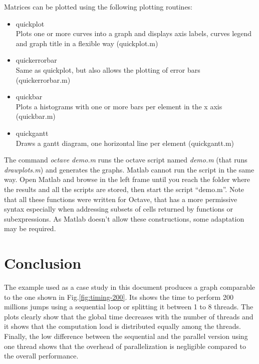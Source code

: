 Matrices can be plotted using the following plotting routines:
\begin{itemize}
\item quickplot\\
Plots one or more curves into a graph and displays axis labels, curves legend and graph title in a flexible way (quickplot.m)
\item quickerrorbar\\
Same as quickplot, but also allows the plotting of error bars (quickerrorbar.m)
\item quickbar\\
Plots a histograms with one or more bars per element in the x axis (quickbar.m)
\item quickgantt\\
Draws a gantt diagram, one horizontal line per element (quickgantt.m)
\end{itemize}

The command \emph{octave demo.m} runs the octave script named \emph{demo.m} (that runs \emph{drawplots.m}) and generates the graphs. Matlab cannot run the script in the same way. Open Matlab and browse in the left frame until you reach the folder where the results and all the scripts are stored, then start the script ``demo.m''. Note that all these functions were written for Octave, that has a more permissive syntax especially when addressing subsets of cells returned by functions or subexpressions. As Matlab doesn't allow these constructions, some adaptation may be required.

\section{Conclusion}
\label{sec:conclusion}
The example used as a case study in this document produces a graph comparable to the one shown in Fig.\ref{fig:timing-200}. Its shows the time to perform 200 millions jumps using a sequential loop or splitting it between 1 to 8 threads. The plots clearly show that the global time decreases with the number of threads and it shows that the computation load is distributed equally among the threads. Finally, the low difference between the sequential and the parallel version using one thread shows that the overhead of parallelization is negligible compared to the overall performance.

